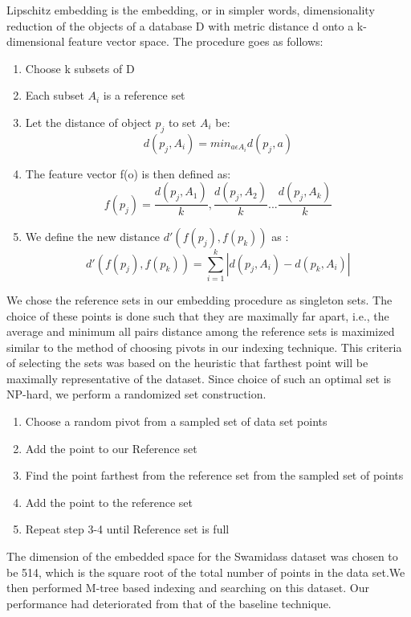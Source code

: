 Lipschitz embedding is the embedding, or in simpler words, dimensionality reduction of the objects of
a database D with metric distance d onto a k-dimensional feature vector space. The procedure goes as follows:
\begin{enumerate}
	\item Choose k subsets of D
	\item Each subset $A_i$ is a reference set
	\item Let the distance of object $p_j$ to set $A_i$ be:
	\[ d(p_j,A_i)= min_{a\epsilon A_{i}}      d(p_j,a) \]
	\item The feature vector f(o) is then defined as:
	\[f(p_j)= {\frac{d(p_j,A_1)}{k},\frac{d(p_j,A_2)}{k}...\frac{d(p_j,A_k)}{k}} \]
	\item We define the new distance $d'(f(p_j),f(p_k))$ as :
	\[d'(f(p_j),f(p_k)) = \sum \limits_{i=1}^{k} | d(p_j,A_i)-d(p_k,A_i)|\] 
\end{enumerate}

	We chose the reference sets in our embedding procedure as singleton sets. The choice of these points is done such that they are maximally far apart, i.e., the average and minimum all pairs distance among the reference sets is maximized similar to the method of choosing pivots in our indexing technique. This criteria of selecting the sets was based on the heuristic that farthest point will be maximally representative of the dataset. Since choice of such an optimal set is NP-hard, we perform a randomized set construction.\\

\begin{enumerate}
	\item Choose a random pivot from a sampled set of  data set points

	\item Add the point to our Reference set

	\item Find the point farthest from the reference set from the sampled set of points

	\item Add the point to the reference set

	\item Repeat step 3-4 until Reference set is full\\
\end{enumerate}

The dimension of the embedded space for the Swamidass dataset was chosen to be 514, which is the square root of the total number of points in the data set.We then performed M-tree based indexing and searching on this dataset. Our performance had deteriorated from that of the baseline technique.